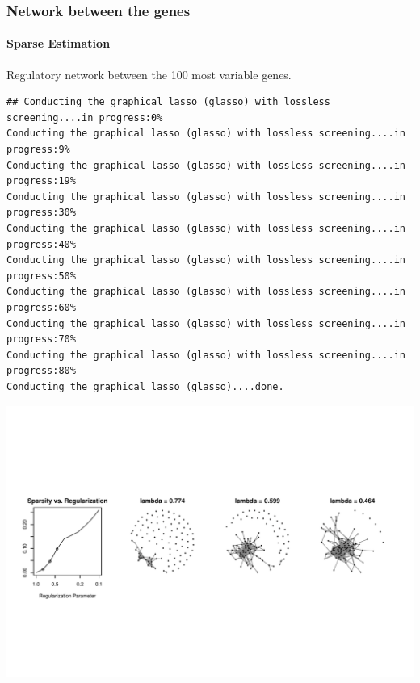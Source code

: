 \begin{frame}
\frametitle{Network between the genes}
\framesubtitle{Sparse Estimation}

Regulatory network between the 100 most variable genes.

\begin{knitrout}\scriptsize
{}\color{fgcolor}\begin{kframe}
\begin{alltt}
 \hlkwb{<-} \hlstd{(}\hlstd{(} \hlstd{=}\hlstd{,} \hlstd{=}\hlstd{)}
\end{alltt}
\begin{verbatim}
## Conducting the graphical lasso (glasso) with lossless screening....in progress:0% 
Conducting the graphical lasso (glasso) with lossless screening....in progress:9% 
Conducting the graphical lasso (glasso) with lossless screening....in progress:19% 
Conducting the graphical lasso (glasso) with lossless screening....in progress:30% 
Conducting the graphical lasso (glasso) with lossless screening....in progress:40% 
Conducting the graphical lasso (glasso) with lossless screening....in progress:50% 
Conducting the graphical lasso (glasso) with lossless screening....in progress:60% 
Conducting the graphical lasso (glasso) with lossless screening....in progress:70% 
Conducting the graphical lasso (glasso) with lossless screening....in progress:80% 
Conducting the graphical lasso (glasso)....done.                                          
\end{verbatim}
\begin{alltt}
\end{alltt}
\end{kframe}
\includegraphics[width=.8\textwidth]{figures/r_show_plasmodium_glasso3-1} 

\end{knitrout}
\end{frame}

